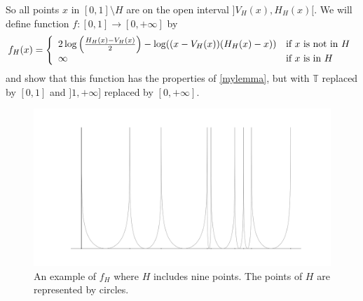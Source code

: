 \documentclass[a4paper,12pt,twoside,BCOR=10mm]{scrbook}
\theoremstyle{definition}
\theoremstyle{definition}
\theoremstyle{definition}
\begin{document}
So all points $x$ in $[0, 1] \setminus H$ are on the open interval $]V_H(x), H_H(x)[$.
We will define function $f: [0, 1] \rightarrow [0, +\infty]$ by
\[
\label{index29}
	f_H(x) =
	\left \{ 
	\begin{array}{l l}
		2\log \left ( \frac{H_H(x) - V_H(x)}{2} \right ) - \log((x - V_H(x))(H_H(x) - x)) & \text{if $x$ is not in $H$}\\
		\infty & \text{if $x$ is in $H$}
	\end{array}
	\right .
\]
and show that this function has the properties of \ref{mylemma}, but with $\mathbb{T}$ replaced by $[0, 1]$ and $]1, +\infty]$ replaced by $[0, +\infty]$.
\begin{figure}[h]
\centering
\includegraphics[width=1\textwidth]{graph8}
\caption{An example of $f_H$ where $H$ includes nine points. The points of $H$ are represented by circles. }
\end{figure}
\end{document}
